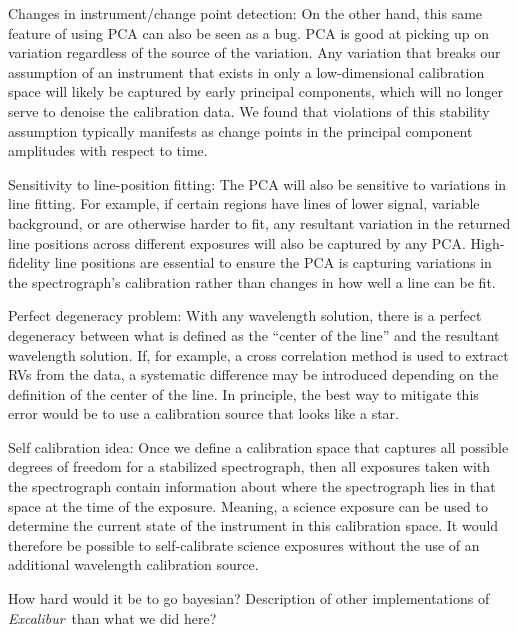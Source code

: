 \documentclass[twocolumn]{aastex63}
\newcommand{\project}[1]{\textsl{#1}}
\newcommand{\name}{\project{Excalibur}}
\begin{document}
Changes in instrument/change point detection:
On the other hand, this same feature of using PCA can also be seen as a bug.  PCA is good at picking up on variation regardless of the source of the variation.  Any variation that breaks our assumption of an instrument that exists in only a low-dimensional calibration space will likely be captured by early principal components, which will no longer serve to denoise the calibration data.  We found that violations of this stability assumption typically manifests as change points in the principal component amplitudes with respect to time.

Sensitivity to line-position fitting:
The PCA will also be sensitive to variations in line fitting.  For example, if certain regions have lines of lower signal, variable background, or are otherwise harder to fit, any resultant variation in the returned line positions across different exposures will also be captured by any PCA.  High-fidelity line positions are essential to ensure the PCA is capturing variations in the spectrograph's calibration rather than changes in how well a line can be fit.

Perfect degeneracy problem:
With any wavelength solution, there is a perfect degeneracy between what is defined as the ``center of the line'' and the resultant wavelength solution.  If, for example, a cross correlation method is used to extract RVs from the data, a systematic difference may be introduced depending on the definition of the center of the line.  In principle, the best way to mitigate this error would be to use a calibration source that looks like a star.

Self calibration idea:
Once we define a calibration space that captures all possible degrees of freedom for a stabilized spectrograph, then all exposures taken with the spectrograph contain information about where the spectrograph lies in that space at the time of the exposure.  Meaning, a science exposure can be used to determine the current state of the instrument in this calibration space.  It would therefore be possible to self-calibrate science exposures without the use of an additional wavelength calibration source.

How hard would it be to go bayesian?  Description of other implementations of \name\ than what we did here?
\end{document}
